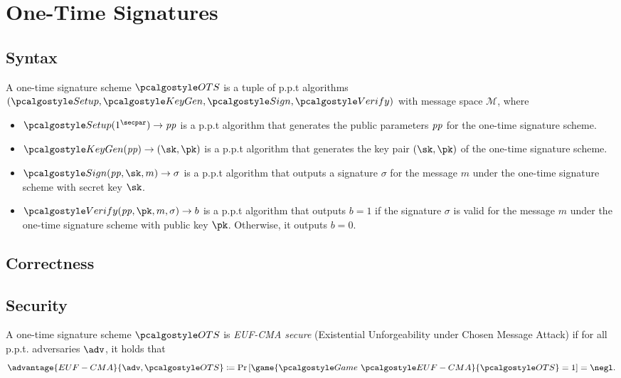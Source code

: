 \section{One-Time Signatures}\label{sec:one-time-sigs}

\subsection{Syntax}

\begin{definition}
    A one-time signature scheme $\algo{OTS}$ is a tuple of p.p.t algorithms $(\algo{Setup}, \algo{KeyGen}, \algo{Sign}, \algo{Verify})$ with message space $\mathcal{M}$, where
    \begin{itemize}
        \item $\algo{Setup}(1^\secpar)\rightarrow \params$ is a p.p.t algorithm that generates the public parameters $\mathit{pp}$ for the one-time signature scheme.
        \item $\algo{KeyGen}(\params)\rightarrow (\sk, \pk)$ is a p.p.t algorithm that generates the key pair $(\sk, \pk)$ of the one-time signature scheme.
        \item $\algo{Sign}(\params, \sk, m) \rightarrow \sigma$ is a p.p.t algorithm that outputs a signature $\sigma$ for the message $m$ under the one-time signature scheme with secret key $\sk$.
        \item $\algo{Verify}(\params, \pk, m, \sigma) \rightarrow b$ is a p.p.t algorithm that outputs $b = 1$ if the signature $\sigma$ is valid for the message $m$ under the one-time signature scheme with public key $\pk$. Otherwise, it outputs $b = 0$.
    \end{itemize}
\end{definition}


\subsection{Correctness}

\subsection{Security}

\begin{definition}\label{def:euf-cma-ot}
    A one-time signature scheme $\algo{OTS}$ is \emph{EUF-CMA secure} (Existential Unforgeability under Chosen Message Attack) if for all p.p.t. adversaries $\adv$, it holds that
    \[
    \advantage{EUF-CMA}{\adv, \algo{OTS}} \defeq \pr{\game{\Game~\algo{EUF-CMA}}{\algo{OTS}} = 1} = \negl.
    \]
\end{definition}

